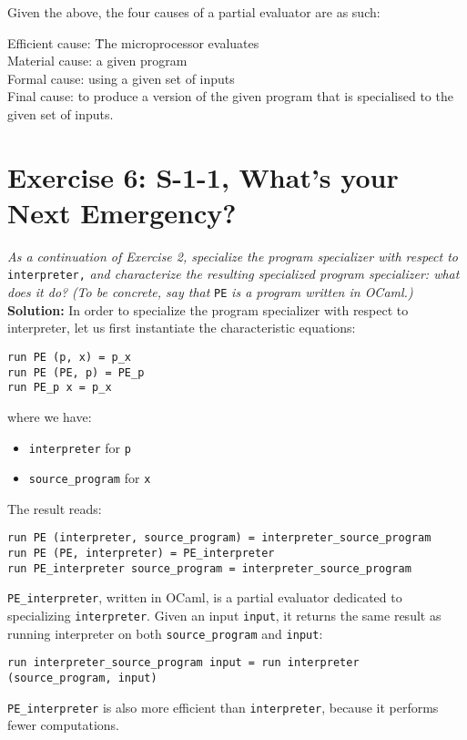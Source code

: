 \documentclass{article}
\begin{document}
Given the above, the four causes of a partial evaluator are as such: 
\begin{tabbing}
Efficient cause: \= The microprocessor evaluates\\
Material cause: \> a given program\\
Formal cause: \> using a given set of inputs\\
Final cause: \> to produce a version of the given program that is specialised to the given set of inputs.\\
\end{tabbing}

\newpage

\section{Exercise 6: S-1-1, What's your Next Emergency?}

\textit{As a continuation of Exercise 2, specialize the program specializer with respect to} \verb+interpreter,+ \textit{and characterize the resulting specialized program specializer: what does it do?} \linebreak
\textit{(To be concrete, say that } \verb+PE+ \textit{ is a program written in OCaml.)} \linebreak \linebreak
\noindent \textbf{Solution:} \linebreak \linebreak
In order to specialize the program specializer with respect to interpreter, let us first instantiate the characteristic equations:
\begin{lstlisting}
run PE (p, x) = p_x
run PE (PE, p) = PE_p
run PE_p x = p_x
\end{lstlisting}
where we have:
\begin{itemize}
    \item \verb+interpreter+ for \verb+p+
    \item \verb+source_program+ for \verb+x+
\end{itemize}
The result reads:
\begin{lstlisting}
run PE (interpreter, source_program) = interpreter_source_program
run PE (PE, interpreter) = PE_interpreter
run PE_interpreter source_program = interpreter_source_program
\end{lstlisting}
\verb+PE_interpreter+, written in OCaml, is a partial evaluator dedicated to specializing \verb+interpreter+. Given an input \verb+input+, it returns the same result as running interpreter on both \verb+source_program+ and \verb+input+:
\begin{lstlisting}
run interpreter_source_program input = run interpreter (source_program, input)
\end{lstlisting}
\verb+PE_interpreter+ is also more efficient than \verb+interpreter+, because it performs fewer computations.
\end{document}
